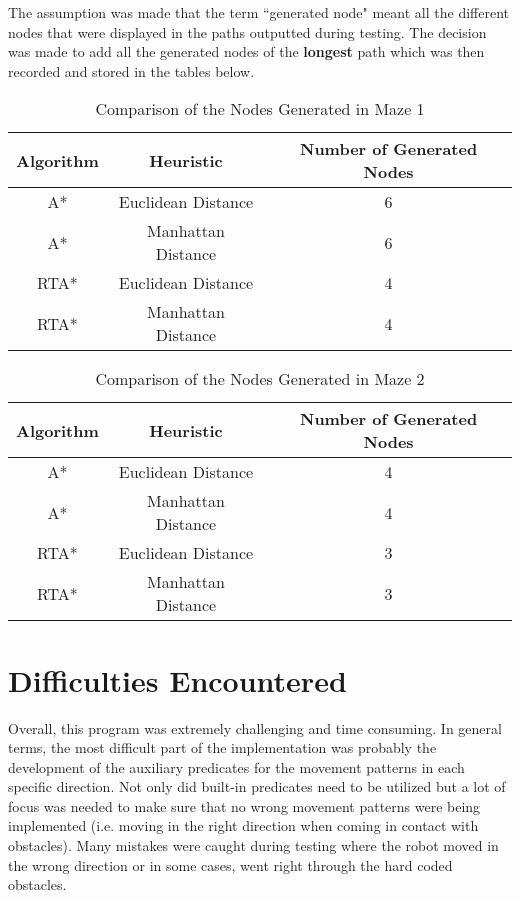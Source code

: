 \documentclass[11pt]{article}
\newcommand{\forceindent}{\leavevmode{\parindent=1em\indent}}
\begin{document}
\forceindent The assumption was made that the term ``generated node" meant all the different nodes that were displayed in the paths outputted during testing. The decision was made to add all the generated nodes of the \textbf{longest} path which was then recorded and stored in the tables below.


\begin{table}[H]
\centering
\caption{Comparison of the Nodes Generated in Maze 1}
\label{my-label}
\begin{tabular}{|c|c|c|}
\hline
\textbf{Algorithm} & \textbf{Heuristic} & \textbf{Number of Generated Nodes} \\ \hline
A*                 & Euclidean Distance & 6                                  \\ \hline
A*                 & Manhattan Distance & 6                                  \\ \hline
RTA*               & Euclidean Distance & 4                                  \\ \hline
RTA*               & Manhattan Distance & 4                                   \\ \hline
\end{tabular}
\end{table}

\begin{table}[H]
\centering
\caption{Comparison of the Nodes Generated in Maze 2}
\label{my-label}
\begin{tabular}{|c|c|c|}
\hline
\textbf{Algorithm} & \textbf{Heuristic} & \textbf{Number of Generated Nodes} \\ \hline
A*                 & Euclidean Distance & 4                                  \\ \hline
A*                 & Manhattan Distance & 4                                  \\ \hline
RTA*               & Euclidean Distance & 3                                  \\ \hline
RTA*               & Manhattan Distance & 3                                  \\ \hline
\end{tabular}
\end{table}


\section{Difficulties Encountered}
\forceindent Overall, this program was extremely challenging and time consuming. In general terms, the most difficult part of the implementation was probably the development of the auxiliary predicates for the movement patterns in each specific direction. Not only did built-in predicates need to be utilized but a lot of focus was needed to make sure that no wrong movement patterns were being implemented (i.e. moving in the right direction when coming in contact with obstacles). Many mistakes were caught during testing where the robot moved in the wrong direction or in some cases, went right through the hard coded obstacles. \\
\end{document}
